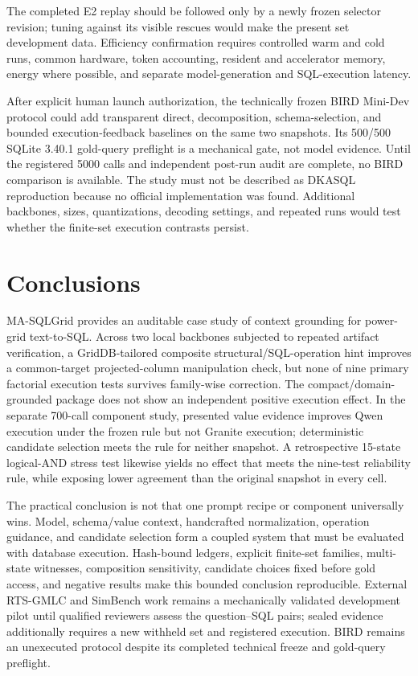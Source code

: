 \documentclass[applsci,article,submit,moreauthors]{Definitions/mdpi}
\newcommand{\masql}{MA-SQLGrid}
\begin{document}
The completed E2 replay should be followed only by a newly frozen selector revision; tuning against its visible rescues would make the present set development data. Efficiency confirmation requires controlled warm and cold runs, common hardware, token accounting, resident and accelerator memory, energy where possible, and separate model-generation and SQL-execution latency.

After explicit human launch authorization, the technically frozen BIRD Mini-Dev protocol could add transparent direct, decomposition, schema-selection, and bounded execution-feedback baselines on the same two snapshots. Its 500/500 SQLite 3.40.1 gold-query preflight is a mechanical gate, not model evidence. Until the registered 5000 calls and independent post-run audit are complete, no BIRD comparison is available. The study must not be described as DKASQL reproduction because no official implementation was found. Additional backbones, sizes, quantizations, decoding settings, and repeated runs would test whether the finite-set execution contrasts persist.

\section{Conclusions}
\masql{} provides an auditable case study of context grounding for power-grid text-to-SQL. Across two local backbones subjected to repeated artifact verification, a GridDB-tailored composite structural/SQL-operation hint improves a common-target projected-column manipulation check, but none of nine primary factorial execution tests survives family-wise correction. The compact/domain-grounded package does not show an independent positive execution effect. In the separate 700-call component study, presented value evidence improves Qwen execution under the frozen rule but not Granite execution; deterministic candidate selection meets the rule for neither snapshot. A retrospective 15-state logical-AND stress test likewise yields no effect that meets the nine-test reliability rule, while exposing lower agreement than the original snapshot in every cell.

The practical conclusion is not that one prompt recipe or component universally wins. Model, schema/value context, handcrafted normalization, operation guidance, and candidate selection form a coupled system that must be evaluated with database execution. Hash-bound ledgers, explicit finite-set families, multi-state witnesses, composition sensitivity, candidate choices fixed before gold access, and negative results make this bounded conclusion reproducible. External RTS-GMLC and SimBench work remains a mechanically validated development pilot until qualified reviewers assess the question--SQL pairs; sealed evidence additionally requires a new withheld set and registered execution. BIRD remains an unexecuted protocol despite its completed technical freeze and gold-query preflight.
\end{document}
